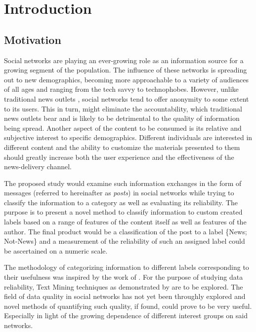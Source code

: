 \section{Introduction}
	\subsection{Motivation}
		Social networks are playing an ever-growing role as an information source for a growing segment of the population. The influence of these networks is spreading out to new demographics, becoming more approachable to a variety of audiences of all ages and ranging from the tech savvy to technophobes. However, unlike traditional news outlets , social networks tend to offer anonymity to some extent to its users. This in turn, might eliminate the accountability, which traditional news outlets bear and is likely to be detrimental to the quality of information being spread. Another aspect of the content to be consumed is its relative and subjective interest to specific demographics. Different individuals are interested in different content and the ability to customize the materials presented to them should greatly increase both the user experience and the effectiveness of the news-delivery channel.
		
		\par
		
		The proposed study would examine such information exchanges in the form of messages (referred to hereinafter as \textit{posts}) in social networks while trying to classify the information to a category as well as evaluating its reliability. The purpose is to present a novel method to classify information to custom created labels based on a range of features of the content itself as well as  features of the author. The final product would be a classification of the post to a label  \{News; Not-News\} and a measurement of the reliability of such an assigned label could be ascertained on a numeric scale.
		
		\par
		
		The methodology of categorizing information to different labels corresponding to their usefulness was inspired by the work of \cite*{castillo2011information}. For the purpose of studying data reliability, Text Mining techniques as demonstrated by \cite*{go2009twitter} are to be explored. The field of data quality in social networks has not yet been throughly explored and novel methods of quantifying such quality, if found, could prove to be very useful. Especially in light of the growing dependence of different interest groups on said networks. 
		
